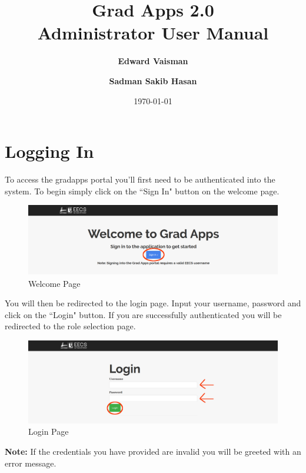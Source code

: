 \documentclass[fontsize=12pt,paper=letter,twoside]{scrartcl}
\author{\textbf{Edward Vaisman}
\and \textbf{Sadman Sakib Hasan}
}
\date{\today} %
\begin{document}
\title{Grad Apps 2.0 \\ Administrator User Manual}
\maketitle

\newpage

\tableofcontents

\newpage



\clearpage
\section{Logging In}

To access the gradapps portal you'll first need to be authenticated into the system. To begin simply click on the ``Sign In" button on the welcome page.

\begin{figure}[!htb]
\begin{center}
\includegraphics[width=.99\textwidth]{images/welcome.png}
\end{center}
\caption{Welcome Page}
\label{fig:welcome}
\end{figure}

\bigskip

You will then be redirected to the login page. Input your username, password and click on the ``Login" button. If you are successfully authenticated you will be redirected to the role selection page.

\begin{figure}[!htb]
\begin{center}
\includegraphics[width=.99\textwidth]{images/login.png}
\end{center}
\caption{Login Page}
\label{fig:login}
\end{figure}
\noindent \textbf{Note:} If the credentials you have provided are invalid you will be greeted with an error message.
\end{document}
